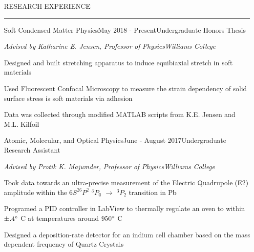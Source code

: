 \documentclass{short_resume} %
\renewenvironment{rSection}[1]{
	\sectionskip
	\textcolor{RoyalPurple}{\MakeUppercase{#1}}
	\sectionlineskip
	\hrule
	\begin{list}{}{
			\setlength{\leftmargin}{1.5em}
		}
		\item[]
	}{
	\end{list}
}
\begin{document}

	
	\begin{rSection}{Research Experience}
		
		\begin{rSubsection}{Soft Condensed Matter Physics}{May 2018 - Present}{Undergraduate Honors Thesis}{}
			\vspace{-.5em}
				\item[] {\em Advised by Katharine E. Jensen, Professor of Physics}\hfill {\em Williams College}
				\item Designed and built stretching apparatus to induce equibiaxial stretch in soft materials
				\item Used Fluorescent Confocal Microscopy to measure the strain dependency of solid surface stress is soft materials via adhesion
				\item Data was collected through modified MATLAB scripts from K.E. Jensen and M.L. Kilfoil
		
		\end{rSubsection}
%		


		\begin{rSubsection}{Atomic, Molecular, and Optical Physics}{June - August 2017}{Undergraduate Research Assistant}{}
			\vspace{-.5em}
			\item[] {\em Advised by Protik K. Majumder, Professor of Physics}\hfill {\em Williams College}
			\item Took data towards an ultra-precise  measurement of the Electric Quadrupole (E2) amplitude within the $6S^26P^2$ $^3P_0$ $\rightarrow$ $^3P_2$ transition in Pb
			\item Programed a PID controller in LabView to thermally regulate an oven to within $\pm .4\degree$ C at temperatures around $ 950\degree $ C
			\item Designed a deposition-rate detector for an indium cell chamber based on the mass dependent frequency of Quartz Crystals
		\end{rSubsection}

\end{rSection}

\pagebreak
\end{document}
